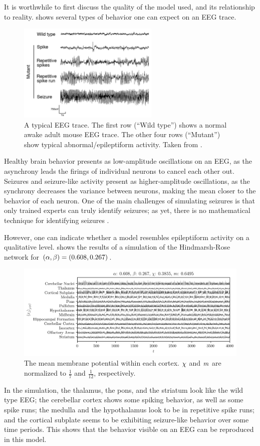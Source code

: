 It is worthwhile to first discuss the quality of the model used, and its relationship to reality.
 shows several types of behavior one can expect on an EEG trace.
\begin{figure}[ht]
  \centering
  \includegraphics[width=0.6\textwidth]{figure/eeg}
  \caption[Typical EEG trace]{A typical EEG trace.
    The first row (``Wild type'') shows a normal awake adult mouse EEG trace.
    The other four rows (``Mutant'') show typical abnormal/epileptiform activity.
    Taken from \cite{Ljungberg2009}.
  }
  \label{fig:eeg}
\end{figure}
Healthy brain behavior presents as low-amplitude oscillations on an EEG, as the asynchrony leads the firings of individual neurons to cancel each other out.
Seizures and seizure-like activity present as higher-amplitude oscillations, as the synchrony decreases the variance between neurons, making the mean closer to the behavior of each neuron.
One of the main challenges of simulating seizures is that only trained experts can truly identify seizures; as yet, there is no mathematical technique for identifying seizures \cite{Kandel2013}.

However, one can indicate whether a model resembles epileptiform activity on a qualitative level.
 shows the results of a simulation of the Hindmarsh-Rose network for $\pqty{\hra, \hrb} = \pqty{0.608, 0.267}$.
\begin{figure}[ht]
  \centering
  \includegraphics[width=\textwidth]{figure/means-0_608-0_267}
  \caption[Mean potential by cortex]{The mean membrane potential within each cortex.
    $\chi$ and $m$ are normalized to $\frac{1}{7}$ and $\frac{1}{12}$, respectively.
  }
  \label{fig:mean_608_267}
\end{figure}
In the simulation,
the thalamus, the pons, and the striatum look like the wild type EEG;
the cerebellar cortex shows some spiking behavior,
as well as some spike runs;
the medulla and the hypothalamus look to be in repetitive spike runs;
and the cortical subplate seems to be exhibiting seizure-like behavior over some time periods.
This shows that the behavior visible on an EEG can be reproduced in this model.

